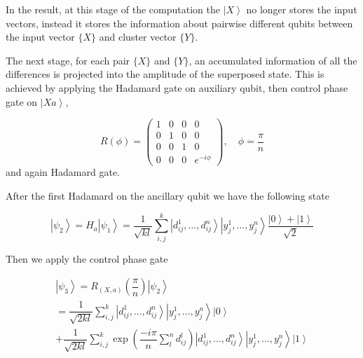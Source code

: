 \documentclass[pra,showkeys,twocolumn,showpacs]{revtex4-1}
\begin{document}
In the result, at this stage of the computation the $\left| X \right\rangle$ no longer stores the input vectors, 
instead it stores the information about pairwise different qubits between the input vector $\{X\}$ and cluster vector $\{Y\}$. 


The next stage, for each pair $\{X\}$ and $\{Y\}$, an accumulated information of all the differences is projected into the amplitude of the superposed state. 
This is achieved by applying the Hadamard gate on auxiliary qubit, then control phase gate on $\left| Xa \right\rangle$,  

\begin{equation}
    \label{eq:control_phase_rotation}
    R(\phi) = 
    \begin{pmatrix}
        1 & 0 & 0 & 0 \\
        0 & 1 & 0 & 0 \\
        0 & 0 & 1 & 0 \\
        0 & 0 & 0 & e^{-i\phi}
    \end{pmatrix},
    \quad \phi = \frac{\pi}{n}
\end{equation}
and again Hadamard gate.


After the first Hadamard on the ancillary qubit we have the following state

\begin{equation}
    \left| \psi_2 \right\rangle = H_a\left| \psi_1 \right\rangle = 
    \frac{1}{\sqrt{kl}} \sum\limits_{i, j}^{k} 
    \left| d^1_{ij}, \dots, d^n_{ij} \right\rangle 
    \left| y^1_j, \dots, y^n_j \right\rangle
    \dfrac{\left| 0 \right\rangle + \left| 1 \right\rangle}{\sqrt{2}}
\end{equation}

Then we apply the control phase gate

\begin{multline}
    \left| \psi_3 \right\rangle = R_{(X,a)}\left(\dfrac{\pi}{n}\right)\left| \psi_2 \right\rangle
    \\ = \dfrac{1}{\sqrt{2kl}}
				\sum\limits_{i, j}^{k} 
				\left| d^1_{ij}, \dots, d^n_{ij} \right\rangle 
        \left| y^1_j, \dots, y^n_j \right\rangle 
        \left| 0 \right\rangle
        \\ + \dfrac{1}{\sqrt{2kl}}
				\sum\limits_{i, j}^{k}
        \exp\left(\dfrac{-i \pi}{n}\sum\limits_l^n d^l_{ij} \right)
        \left| d^1_{ij}, \dots, d^n_{ij} \right\rangle 
        \left| y^1_j, \dots, y^n_j \right\rangle 
        \left| 1 \right\rangle
\end{multline}
\end{document}
